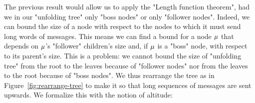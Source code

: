 
The previous result would allow us to apply the "Length function theorem", had we in our "unfolding tree" only "boss nodes" or only "follower nodes". Indeed, we can bound the size of a node with respect to the nodes to which it must send long words of messages. This means we can find a bound for a node $\mu$ that depends on $\mu$'s "follower" children's size and, if $\mu$ is a "boss" node, with respect to its parent's size. This is a problem: we cannot bound the size of "unfolding tree" from the root to the leaves because of "follower nodes" nor from the leaves to the root because of "boss nodes". We thus rearrange the tree as in Figure~\ref{fig:rearrange-tree} to make it so that long sequences of messages are sent upwards. We formalize this with the notion of altitude:

